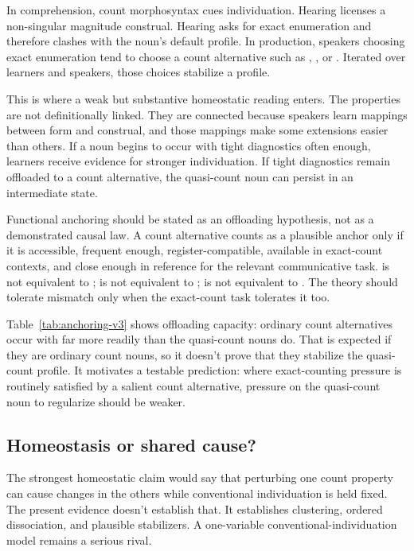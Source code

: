 \documentclass[12pt,a4paper]{article}
\begin{document}
In comprehension, count morphosyntax cues individuation. Hearing  licenses a non-singular magnitude construal. Hearing  asks for exact enumeration and therefore clashes with the noun's default profile. In production, speakers choosing exact enumeration tend to choose a count alternative such as , , or . Iterated over learners and speakers, those choices stabilize a profile.

This is where a weak but substantive homeostatic reading enters. The properties are not definitionally linked. They are connected because speakers learn mappings between form and construal, and those mappings make some extensions easier than others. If a noun begins to occur with tight diagnostics often enough, learners receive evidence for stronger individuation. If tight diagnostics remain offloaded to a count alternative, the quasi-count noun can persist in an intermediate state.



Functional anchoring should be stated as an offloading hypothesis, not as a demonstrated causal law. A count alternative counts as a plausible anchor only if it is accessible, frequent enough, register-compatible, available in exact-count contexts, and close enough in reference for the relevant communicative task.  is not equivalent to ;  is not equivalent to ;  is not equivalent to . The theory should tolerate mismatch only when the exact-count task tolerates it too.

Table~\ref{tab:anchoring-v3} shows offloading capacity: ordinary count alternatives occur with  far more readily than the quasi-count nouns do. That is expected if they are ordinary count nouns, so it doesn't prove that they stabilize the quasi-count profile. It motivates a testable prediction: where exact-counting pressure is routinely satisfied by a salient count alternative, pressure on the quasi-count noun to regularize should be weaker.

\subsection{Homeostasis or shared cause?}\label{sec:homeostasis-v3}

The strongest homeostatic claim would say that perturbing one count property can cause changes in the others while conventional individuation is held fixed. The present evidence doesn't establish that. It establishes clustering, ordered dissociation, and plausible stabilizers. A one-variable conventional-individuation model remains a serious rival.
\end{document}

